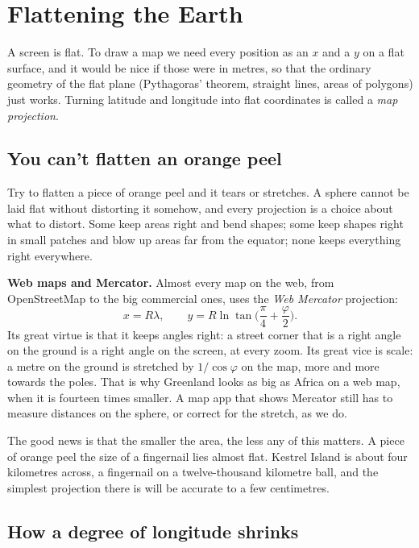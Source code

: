 \chapter{Flattening the Earth}\label{ch:projection}

A screen is flat. To draw a map we need every position as an $x$ and a $y$
on a flat surface, and it would be nice if those were in metres, so that
the ordinary geometry of the flat plane (Pythagoras' theorem, straight
lines, areas of polygons) just works. Turning latitude and longitude into
flat coordinates is called a \emph{map projection}.

\section{You can't flatten an orange peel}

Try to flatten a piece of orange peel and it tears or stretches. A sphere
cannot be laid flat without distorting it somehow, and every projection is
a choice about what to distort. Some keep areas right and bend shapes; some
keep shapes right in small patches and blow up areas far from the equator;
none keeps everything right everywhere.

\begin{aside}
\textbf{Web maps and Mercator.} Almost every map on the web, from
OpenStreetMap to the big commercial ones, uses the \emph{Web Mercator}
projection:
\[
  x = R\lambda, \qquad y = R \ln\tan\Big(\frac{\pi}{4} + \frac{\varphi}{2}\Big).
\]
Its great virtue is that it keeps angles right: a street corner that is a
right angle on the ground is a right angle on the screen, at every zoom.
Its great vice is scale: a metre on the ground is stretched by
$1/\cos\varphi$ on the map, more and more towards the poles. That is why
Greenland looks as big as Africa on a web map, when it is fourteen times
smaller. A map app that shows Mercator still has to measure distances on
the sphere, or correct for the stretch, as we do.
\end{aside}

The good news is that the smaller the area, the less any of this matters. A
piece of orange peel the size of a fingernail lies almost flat. Kestrel
Island is about four kilometres across, a fingernail on a twelve-thousand
kilometre ball, and the simplest projection there is will be accurate to a
few centimetres.

\section{How a degree of longitude shrinks}

